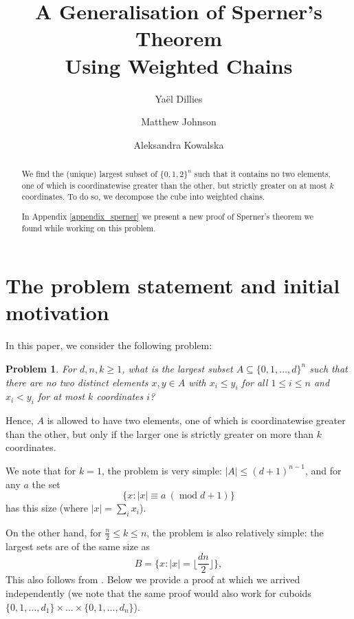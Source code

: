 \documentclass[11pt, reqno]{amsart}
\title{A Generalisation of Sperner's Theorem \\ Using Weighted Chains}
\author{Ya\"el Dillies}
\author{Matthew Johnson}
\author{Aleksandra Kowalska}
\newtheorem{problem}{Problem}
\numberwithin{equation}{section}
\newcommand\modd{\operatorname{mod}}
\begin{document}
\begin{abstract}
    We find the (unique) largest subset of $\{0, 1, 2\}^n$ such that it contains no two elements, one of which is coordinatewise greater than the other, but strictly greater on at most $k$ coordinates. To do so, we decompose the cube into weighted chains.

    In Appendix \ref{appendix_sperner} we present a new proof of Sperner's theorem we found while working on this problem.
\end{abstract}

\maketitle

\section{The problem statement and initial motivation}

In this paper, we consider the following problem:

\begin{problem}
\label{the_main_problem}
    For $d, n, k \geqslant 1$, what is the largest subset $A \subseteq \{0, 1, \dots, d\}^n$ such that there are no two distinct elements $x, y \in A$ with $x_i \leqslant y_i$ for all $1 \leqslant i \leqslant n$ and $x_i < y_i$ for at most $k$ coordinates $i$?
\end{problem}

Hence, $A$ is allowed to have two elements, one of which is coordinatewise greater than the other, but only if the larger one is strictly greater on more than $k$ coordinates.

We note that for $k=1$, the problem is very simple: $|A| \leqslant (d+1)^{n-1}$, and for any $a$ the set
\begin{equation}
    \Big\{ x: |x| \equiv a \ (\modd d+1) \Big\}
\end{equation}
has this size (where $|x|=\sum_i x_i$).

On the other hand, for $\frac{n}{2} \leqslant k \leqslant n$, the problem is also relatively simple: the largest sets are of the same size as
\begin{equation}
    B = \Big\{ x: |x| = \Big\lfloor \frac{dn}{2} \Big\rfloor \Big\},
\end{equation}
This also follows from \cite[Theorem 5.1]{tour_m_part_p_sperner_families}. Below we provide a proof at which we arrived independently (we note that the same proof would also work for cuboids $\{0, 1, \dots, d_1\} \times \dots \times \{0, 1, \dots, d_n\}$).
\end{document}
